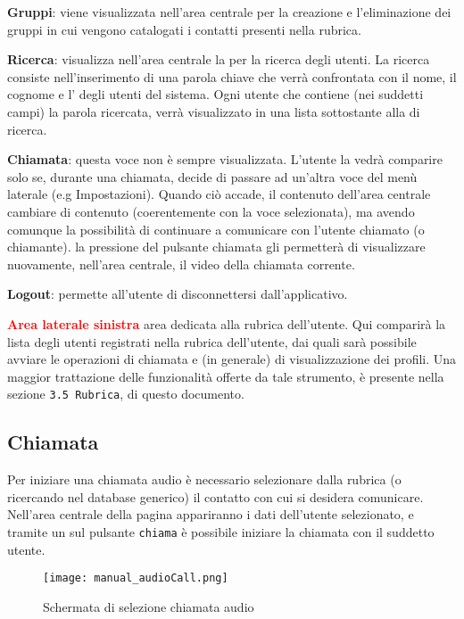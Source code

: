 \begin{description}
\begin{description}
\item \textbf{Gruppi}: viene visualizzata nell'area centrale  per la creazione e l'eliminazione dei gruppi in cui vengono catalogati i contatti presenti nella rubrica.
\item \textbf{Ricerca}: visualizza nell'area centrale la  per la ricerca degli utenti. La ricerca consiste nell'inserimento di una parola chiave che verrà confrontata con il nome, il cognome e l' degli utenti del sistema. Ogni utente che contiene (nei suddetti campi) la parola ricercata, verrà visualizzato in una lista sottostante alla  di ricerca.
\item \textbf{Chiamata}: questa voce non è sempre visualizzata. L'utente la vedrà comparire solo se, durante una chiamata, decide di passare ad un'altra voce del menù laterale (e.g Impostazioni). Quando ciò accade, il contenuto dell'area centrale cambiare di contenuto (coerentemente con la voce selezionata), ma avendo comunque la possibilità di continuare a comunicare con l'utente chiamato (o chiamante). la pressione del pulsante chiamata gli permetterà di visualizzare nuovamente, nell'area centrale, il video della chiamata corrente.
\item \textbf{Logout}: permette all'utente di disconnettersi dall'applicativo.
\end{description}
\item \textcolor{red}{\textbf{Area laterale sinistra}} area dedicata alla rubrica dell'utente. Qui comparirà la lista degli utenti registrati nella rubrica dell'utente, dai quali sarà possibile avviare le operazioni di chiamata e (in generale) di visualizzazione dei profili. Una maggior trattazione delle funzionalità offerte da tale strumento, è presente nella sezione \texttt{3.5 Rubrica}, di questo documento.
\end{description}

\subsection{Chiamata}
Per iniziare una chiamata audio è necessario selezionare dalla rubrica (o ricercando nel database generico) il contatto con cui si desidera comunicare. Nell'area centrale della pagina appariranno i dati dell'utente selezionato, e tramite un  sul pulsante \texttt{chiama} è possibile iniziare la chiamata con il suddetto utente.

\begin{figure}[H]
  \texttt{[image: manual\_audioCall.png]}
\caption{Schermata di selezione chiamata audio}\label{fig:audioCall}
\end{figure}

